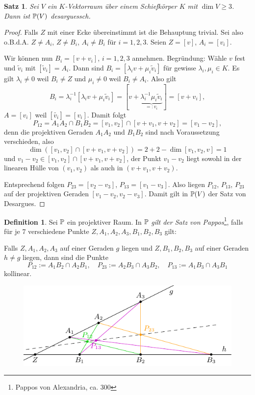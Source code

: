 \documentclass[
 a4paper,
 12pt,
 parskip=half
 ]{scrartcl}
\theoremstyle{plain}
\newtheorem{thm}{Satz}[section] %
\theoremstyle{definition}
\newtheorem*{defn*}{Definition}
\begin{document}
\begin{thm}
 Sei $V$ ein $K$-Vektorraum über einem Schiefkörper $K$ mit $\dim V \ge 3$. Dann ist $\mathbb{P}(V)$ desarguessch.
\end{thm}

\begin{proof}
 Falls $Z$ mit einer Ecke übereinstimmt ist die Behauptung trivial. Sei also o.B.d.A. $Z \ne A_i$, $Z \ne B_i$, $A_i \ne B_i$ für $i = 1,2,3$. Seien $Z = [v]$, $A_i = [v_i]$. 
 
 Wir können nun $B_i = [v + v_i]$, $i = 1,2,3$ annehmen. Begründung: Wähle $v$ fest und $\tilde{v}_i$ mit $[\tilde{v}_i] = A_i$. Dann sind $B_i = [\lambda_i v + \mu_i \tilde{v}_i]$ für gewisse $\lambda_i, \mu_i \in K$. Es gilt $\lambda_i \ne 0$ weil $B_i \ne Z$ und $\mu_i \ne 0$ weil $B_i \ne A_i$. Also gilt 
 \[ B_i = \lambda_i^{-1} [\lambda_i v + \mu_i \tilde{v}_i] = [v + \underbrace{\lambda_i^{-1} \mu_i \tilde{v}_i}_{=: v_i}] = [v + v_i], \]
 $A = [v_i]$ weil $[\tilde{v_i}] = [v_i]$. Damit folgt 
 \[ P_{12} = A_1 A_2 \cap B_1 B_2 = [v_1 , v_2] \cap [v + v_1, v + v_2 ] = [v_1 - v_2], \]
 denn die projektiven Geraden $A_1 A_2$ und $B_1 B_2$ sind nach Voraussetzung verschieden, also
 \[ \dim( [v_1, v_2] \cap [v + v_1, v + v_2 ] ) = 2 + 2 - \dim[v_1, v_2, v] = 1 \]
 und $v_1 - v_2 \in [v_1, v_2] \cap [v + v_1, v + v_2]$, der Punkt $v_1-v_2$ liegt sowohl in der linearen Hülle von $(v_1, v_2)$ als auch in $(v + v_1, v + v_2)$.

 Entsprechend folgen $P_{23} = [v_2 - v_3]$, $P_{13} = [v_1 - v_3]$. Also liegen $P_{12}$, $P_{13}$, $P_{23}$ auf der projektiven Geraden $[v_1 - v_2, v_2 - v_3]$. Damit gilt in $\mathbb{P}(V)$ der Satz von Desargues.
\end{proof}

\begin{defn*}
 Sei $\mathbb{P}$ ein projektiver Raum. In $\mathbb{P}$ \emph{gilt der Satz von Pappos}\footnote{Pappos von Alexandria, ca. 300}, falls für je 7 verschiedene Punkte $Z, A_1, A_2, A_3, B_1, B_2, B_3$ gilt:
 \begin{addmargin}{1cm} 
 Falls $Z, A_1, A_2, A_3$ auf einer Geraden $g$ liegen und $Z, B_1, B_2, B_3$ auf einer Geraden $h \ne g$ liegen, dann sind die Punkte 
 \[ P_{12} := A_1 B_2 \cap A_2 B_1, \quad P_{23} := A_2 B_3 \cap A_3 B_2, \quad P_{13} := A_1 B_3 \cap A_3 B_1 \]
 kollinear.
 \end{addmargin}
\end{defn*}

\begin{figure}[ht]
 \center
 \includegraphics[width=12cm]{img/pappos}
\end{figure}
\end{document}
